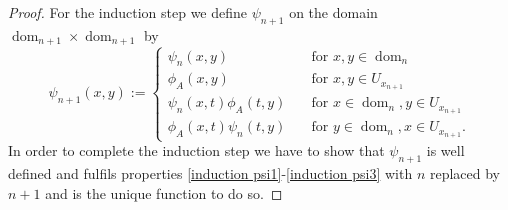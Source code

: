 \documentclass[b5paper,draft,openbib,12pt]{memoir}
\DeclareMathOperator{\dom}{dom}
\begin{document}
\begin{proof}
For the induction step we 
define \(\psi_{n+1}\) on the domain 
\(\dom_{n+1}\times \dom_{n+1}\) by
 \begin{equation}\label{def psi induction}
 \psi_{n+1}(x,y):=\left\{\begin{matrix}
 \psi_n(x,y) \quad &\text{for }x,y\in \dom_n\\
 \phi_A(x,y) \quad &\text{for } x,y\in U_{x_{n+1}}\\
 \psi_n(x,t)\phi_A(t,y)\quad &\text{for } x\in \dom_n, y\in U_{x_{n+1}}\\
 \phi_A(x,t)\psi_n(t,y)\quad &\text{for } y\in \dom_n, x\in U_{x_{n+1}}.
 \end{matrix} \right.
 \end{equation} 
In order to complete the induction step we have to show that 
\(\psi_{n+1}\) is well defined and fulfils properties
\eqref{induction psi1}-\eqref{induction psi3} 
with \(n\) replaced by \(n+1\) and is the unique function 
to do so.
  

\end{proof}
\end{document}
